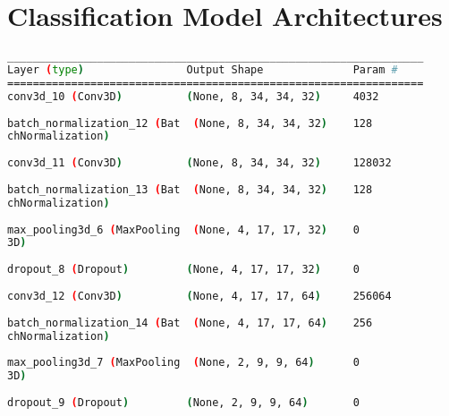 \chapter{Classification Model Architectures}

\begin{lstlisting}[language=Bash,caption={Overview of layers in 3D convolutional network},label={lst:3d_conv_layers},numbers=none,float=htb]
_________________________________________________________________
Layer (type)                Output Shape              Param #   
=================================================================
conv3d_10 (Conv3D)          (None, 8, 34, 34, 32)     4032      
                                                                
batch_normalization_12 (Bat  (None, 8, 34, 34, 32)    128       
chNormalization)                                                
                                                                
conv3d_11 (Conv3D)          (None, 8, 34, 34, 32)     128032    
                                                                
batch_normalization_13 (Bat  (None, 8, 34, 34, 32)    128       
chNormalization)                                                
                                                                
max_pooling3d_6 (MaxPooling  (None, 4, 17, 17, 32)    0         
3D)                                                             
                                                                
dropout_8 (Dropout)         (None, 4, 17, 17, 32)     0         
                                                                
conv3d_12 (Conv3D)          (None, 4, 17, 17, 64)     256064    
                                                                
batch_normalization_14 (Bat  (None, 4, 17, 17, 64)    256       
chNormalization)                                                
                                                                
max_pooling3d_7 (MaxPooling  (None, 2, 9, 9, 64)      0         
3D)                                                             
                                                                
dropout_9 (Dropout)         (None, 2, 9, 9, 64)       0         
                                                                

\end{lstlisting}
